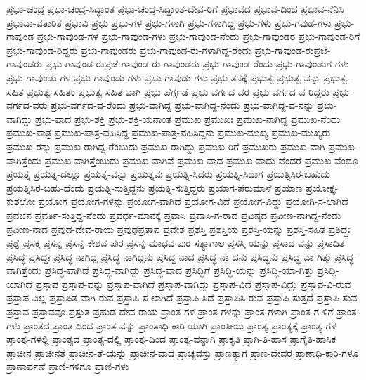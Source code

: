 {ಪ್ರಭಾ-ಚಂದ್ರ
ಪ್ರಭಾ-ಚಂದ್ರ-ಸಿದ್ಧಾಂತ
ಪ್ರಭಾ-ಚಂದ್ರ-ಸಿದ್ಧಾಂತ-ದೇವ-ರಿಗೆ
ಪ್ರಭಾವದ
ಪ್ರಭಾವ-ದಿಂದ
ಪ್ರಭಾವ-ನೆನಿಸಿ
ಪ್ರಭಾವಾ-ವತಾರಿತ
ಪ್ರಭಾವಿ
ಪ್ರಭು
ಪ್ರಭು-ಗಳ
ಪ್ರಭು-ಗಳಾಗಿ
ಪ್ರಭು-ಗಳಾಗಿದ್ದ
ಪ್ರಭು-ಗಳು
ಪ್ರಭು-ಗವುಡ-ಗಳು
ಪ್ರಭು-ಗಾವುಂಡ
ಪ್ರಭು-ಗಾವುಂಡ-ಗಳ
ಪ್ರಭು-ಗಾವುಂಡ-ಗಳು
ಪ್ರಭು-ಗಾವುಂಡ-ನೆಂದು
ಪ್ರಭು-ಗಾವುಂಡರ
ಪ್ರಭು-ಗಾವುಂಡ-ರಿಗೆ
ಪ್ರಭು-ಗಾವುಂಡ-ರಿದ್ದರು
ಪ್ರಭು-ಗಾವುಂಡರು
ಪ್ರಭು-ಗಾವುಂಡ-ರು-ಗಳಾಗಿದ್ದ-ರೆಂದು
ಪ್ರಭು-ಗಾವುಂಡ-ರುಪ್ರಜೆ-ಗಾವುಂಡರು
ಪ್ರಭು-ಗಾವುಂಡ-ರುಪ್ರಜೆ-ಗಾವುಂಡ-ರು-ಗಾವುಂಡರು
ಪ್ರಭು-ಗಾವುಂಡ-ರೆಂದು
ಪ್ರಭು-ಗಾವುಂಡುಗ-ಗಳು
ಪ್ರಭು-ಗಾವುಂಡು-ಗಳ
ಪ್ರಭು-ಗಾವುಂಡು-ಗಳು
ಪ್ರಭು-ಗಾವುಡು-ಗಳು
ಪ್ರಭು-ತನಕ್ಕೆ
ಪ್ರಭುತ್ವ
ಪ್ರಭುತ್ವ-ವನ್ನು
ಪ್ರಭುತ್ವ-ಸಹಿತ
ಪ್ರಭುತ್ವ-ಸಹಿತಂ
ಪ್ರಭುತ್ವ-ಸಹಿತ-ವಾಗಿ
ಪ್ರಭು-ಪೆರ್ಗ್ಗಡೆ
ಪ್ರಭು-ವರ್ಗದ-ವರ
ಪ್ರಭು-ವರ್ಗದ-ವ-ರಿದ್ದರು
ಪ್ರಭು-ವರ್ಗದ-ವರು
ಪ್ರಭು-ವರ್ಗದ-ವ-ರೆಂದು
ಪ್ರಭು-ವಾಗಿದ್ದ
ಪ್ರಭು-ವಾಗಿದ್ದ-ನೆಂದು
ಪ್ರಭು-ವಾಗಿದ್ದ-ವ-ನನ್ನು
ಪ್ರಭು-ವಾಗಿದ್ದು
ಪ್ರಭು-ವಾದ
ಪ್ರಭು-ಶಕ್ತಿ
ಪ್ರಭು-ಶಕ್ತಿ-ಯನಾಂತ
ಪ್ರಮುಖ
ಪ್ರಮುಖಃ
ಪ್ರಮುಖ-ನಾಗಿದ್ದ
ಪ್ರಮುಖ-ನೆಂದು
ಪ್ರಮುಖ-ಪಾತ್ರ
ಪ್ರಮುಖ-ಪಾತ್ರ-ವಹಿಸಿದ್ದ
ಪ್ರಮುಖ-ಪಾತ್ರ-ವಹಿಸಿದ್ದನು
ಪ್ರಮುಖ-ಮುಖ್ಯ
ಪ್ರಮುಖ-ಮುಖ್ಯರು
ಪ್ರಮುಖ-ರನ್ನು
ಪ್ರಮುಖ-ರಾಗಿದ್ದ-ರೆಂಬುದು
ಪ್ರಮುಖ-ರಾಗಿದ್ದು
ಪ್ರಮುಖ-ರಿಗೆ
ಪ್ರಮುಖರು
ಪ್ರಮುಖ-ವಾಗಿ
ಪ್ರಮುಖ-ವಾಗಿತ್ತೆಂದು
ಪ್ರಮುಖ-ವಾಗಿತ್ತೆಂಬುದು
ಪ್ರಮುಖ-ವಾಗಿವೆ
ಪ್ರಮುಖ-ವಾದ
ಪ್ರಮುಖ-ವಾದು-ವೆಂದರೆ
ಪ್ರಮುಖ-ವೆಂದೂ
ಪ್ರಯತ್ನ
ಪ್ರಯತ್ನ-ದಲ್ಲೂ
ಪ್ರಯತ್ನ-ವನ್ನು
ಪ್ರಯತ್ನವು
ಪ್ರಯತ್ನಿ-ಸಿದರು
ಪ್ರಯತ್ನಿ-ಸಿದಾಗ
ಪ್ರಯತ್ನಿಸಿರ-ಬಹುದು
ಪ್ರಯತ್ನಿಸಿರ-ಬಹು-ದೆಂದು
ಪ್ರಯತ್ನಿ-ಸುತ್ತಿದ್ದನು
ಪ್ರಯತ್ನಿ-ಸುತ್ತಿದ್ದರು
ಪ್ರಯಾಗ-ಪೆರುಮಾಳೆ
ಪ್ರಯಾಣ
ಪ್ರಯೋಕ್ತೃ-ಕುಶಲೋ
ಪ್ರಯೋಗ
ಪ್ರಯೋಗ-ಗಳನ್ನು
ಪ್ರಯೋಗ-ವಾಗಿದೆ
ಪ್ರಯೋಗ-ವಿದೆ
ಪ್ರಯೋಗ-ವಿದ್ದು
ಪ್ರಯೋಗಿ-ಸ-ಲಾಗಿದೆ
ಪ್ರವಚನ
ಪ್ರವರ್ತಿ-ಸುತ್ತಿದ್ದ-ನೆಂದು
ಪ್ರವರ್ಧ-ಮಾನಕ್ಕೆ
ಪ್ರವಾಸಿ
ಪ್ರವಾಸಿ-ಗ-ರಾದ
ಪ್ರವಿಷ್ಠದ
ಪ್ರವೀಣ-ನಾಗಿದ್ದ-ನೆಂದು
ಪ್ರವೀಣ-ನಾದ
ಪ್ರವುಡ-ದೇವ-ರಾಯ
ಪ್ರವುಢಪ್ರತಾಪ
ಪ್ರವೇಶ
ಪ್ರಶಸ್ತಿ
ಪ್ರಶಸ್ತಿಯ
ಪ್ರಶಸ್ತಿ-ಯನ್ನು
ಪ್ರಶಸ್ತಿ-ಸಹಿತ
ಪ್ರಶಿದ್ಧಃ
ಪ್ರಶ್ನೆ
ಪ್ರಸಕ್ತ
ಪ್ರಸನ್ನ
ಪ್ರಸನ್ನ-ಕೇಶವ-ಪುರ
ಪ್ರಸನ್ನ-ಮಾಧವ-ಪುರ-ಸತ್ಯಾಗಾಲ
ಪ್ರಸಸ್ತಿ-ಯನ್ನು
ಪ್ರಸಾದ-ವನ್ನು
ಪ್ರಸಾದಿತ
ಪ್ರಸಿದ್ಧ
ಪ್ರಸಿದ್ಧಃ
ಪ್ರಸಿದ್ಧ-ನಾಗಿದ್ದ
ಪ್ರಸಿದ್ಧ-ನಾಗಿದ್ದನು
ಪ್ರಸಿದ್ಧ-ನಾದ
ಪ್ರಸಿದ್ಧ-ನಾ-ದನು
ಪ್ರಸಿದ್ಧನು
ಪ್ರಸಿದ್ಧ-ವಾ-ಗಿತ್ತು
ಪ್ರಸಿದ್ಧ-ವಾಗಿತ್ತೆಂದು
ಪ್ರಸಿದ್ಧ-ವಾಗಿದೆ
ಪ್ರಸಿದ್ಧ-ವಾಗಿದ್ದು
ಪ್ರಸಿದ್ಧ-ವಾದ
ಪ್ರಸಿದ್ಧಿಗೆ
ಪ್ರಸಿದ್ಧಿ-ಯನ್ನು
ಪ್ರಸಿದ್ಧಿ-ಯಾ-ಗಿತ್ತು
ಪ್ರಸಿದ್ಧಿ-ಯಾಗಿದೆ
ಪ್ರಸ್ತಾಪ
ಪ್ರಸ್ತಾಪ-ವನ್ನು
ಪ್ರಸ್ತಾಪ-ವಾಗಿದೆ
ಪ್ರಸ್ತಾಪ-ವಾಗಿದ್ದು
ಪ್ರಸ್ತಾಪ-ವಿದೆ
ಪ್ರಸ್ತಾಪ-ವಿದ್ದು
ಪ್ರಸ್ತಾಪ-ವಿ-ರುವ
ಪ್ರಸ್ತಾಪ-ವಿಲ್ಲ
ಪ್ರಸ್ತಾಪಿತ-ವಾಗಿ-ರುವ
ಪ್ರಸ್ತಾಪಿ-ಸ-ಲಾಗಿದೆ
ಪ್ರಸ್ತಾಪಿ-ಸಿದೆ
ಪ್ರಸ್ತಾಪಿಸಿ-ರುವ
ಪ್ರಸ್ತಾಪಿ-ಸುತ್ತದೆ
ಪ್ರಸ್ತಾಪಿ-ಸುವ
ಪ್ರಸ್ತಾವ
ಪ್ರಸ್ತಾವವೂ
ಪ್ರಸ್ತುತ
ಪ್ರಹುಡ-ದೇವ-ರಾಯ
ಪ್ರಾಂತ-ಗಳ
ಪ್ರಾಂತ-ಗಳನ್ನು
ಪ್ರಾಂತ-ಗಳಾಗಿ
ಪ್ರಾಂತ-ಗ-ಳಿಗೆ
ಪ್ರಾಂತ-ಗಳು
ಪ್ರಾಂತದ
ಪ್ರಾಂತ-ದಿಂದ
ಪ್ರಾಂತ-ವನ್ನು
ಪ್ರಾಂತಾಧಿ-ಕಾರಿ-ಯಾಗಿ
ಪ್ರಾಂತೀಯ
ಪ್ರಾಂತ್ಯ
ಪ್ರಾಂತ್ಯಕ್ಕೆ
ಪ್ರಾಂತ್ಯ-ಗಳ
ಪ್ರಾಂತ್ಯ-ಗಳಲ್ಲಿ
ಪ್ರಾಂತ್ಯದ
ಪ್ರಾಂತ್ಯ-ದಲ್ಲಿ
ಪ್ರಾಂತ್ಯ-ದಿಂದ
ಪ್ರಾಂತ್ಯ-ವನ್ನಾಗಿ
ಪ್ರಾಕೃತಿ
ಪ್ರಾಗಿ-ತಿ-ಹಾಸ
ಪ್ರಾಗೈತಿ-ಹಾಸಿಕ
ಪ್ರಾಚೀನ
ಪ್ರಾಚೀನತೆ
ಪ್ರಾಚೀನ-ತೆ-ಯನ್ನು
ಪ್ರಾಚೀನ-ವಾದ
ಪ್ರಾಚ್ಯವಸ್ತು
ಪ್ರಾಣತ್ಯಾಗ
ಪ್ರಾಣ-ದೇವರ
ಪ್ರಾಣಾಧಿ-ಕಾರಿ-ಗಳೂ
ಪ್ರಾಣಾರ್ಪಣೆ
ಪ್ರಾಣಿ-ಗಳಿಗೂ
ಪ್ರಾಣಿ-ಗಳು
}
